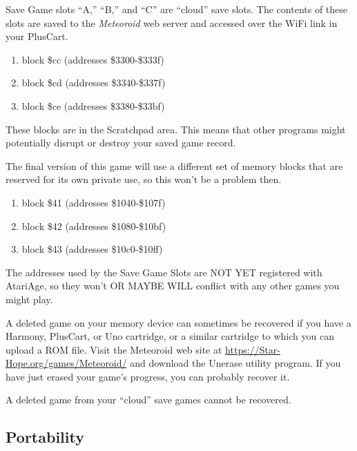 \documentclass[10pt,twocolumn,openany,article]{memoir}
\begin{document}
\ifdefined\PLUSCART

Save  Game slots  ``A,''  ``B,''  and ``C''  are  ``cloud'' save  slots.
The  contents of  these slots  are saved  to the  \textit{Meteoroid} web
server and accessed over the WiFi link in your PlusCart.

\fi

\ifdefined\DEMO

\begin{enumerate}
\item block \$cc (addresses \$3300-\$333f)
\item block \$cd (addresses \$3340-\$337f)
\item block \$ce (addresses \$3380-\$33bf)
\end{enumerate}

These blocks are in the Scratchpad  area. This means that other programs
might potentially disrupt or destroy your saved game record.

The final version of this game will use a different set of memory blocks
that  are  reserved   for  its  own  private  use,  so   this  won't  be
a problem then.

\else

\begin{enumerate}
\item block \$41 (addresses \$1040-\$107f)
\item block \$42 (addresses \$1080-\$10bf)
\item block \$43 (addresses \$10c0-\$10ff)
\end{enumerate}

The addresses  used by the Save  Game Slots are NOT  YET registered with
AtariAge, so they won't OR MAYBE  WILL conflict with any other games you
might play.

A deleted game  on your memory device can sometimes  be recovered if you
have a  Harmony, PlusCart, or Uno  cartridge, or a similar  cartridge to
which  you can  upload  a ROM  file.  Visit the  Meteoroid  web site  at
\href{https://Star-Hope.org/games/Meteoroid/}{https://Star-Hope\-.org/\-games/\-Meteoroid/}
and download the  Unerase utility program. If you have  just erased your
game's progress, you can probably recover it.

\ifdefined\PLUSCART
A deleted game from your ``cloud'' save games cannot be recovered.
\fi

\fi


\subsection{Portability}
\end{document}
